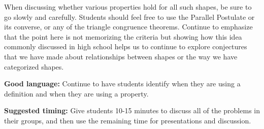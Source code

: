 \documentclass[nooutcomes,noauthor, handout]{ximera}
\begin{document}
\begin{instructorNotes}
When discussing whether various properties hold for all such shapes, be sure to go slowly and carefully. Students should feel free to use the Parallel Postulate or its converse, or any of the triangle congruence theorems. Continue to emphasize that the point here is not memorizing the criteria but showing how this idea commonly discussed in high school helps us to continue to explore conjectures that we have made about relationships between shapes or the way we have categorized shapes.



{\bf Good language:} Continue to have students identify when they are using a definition and when they are using a property.

{\bf Suggested timing:} Give students 10-15 minutes to discuss all of the problems in their groups, and then use the remaining time for presentations and discussion.


\end{instructorNotes}
\end{document}
